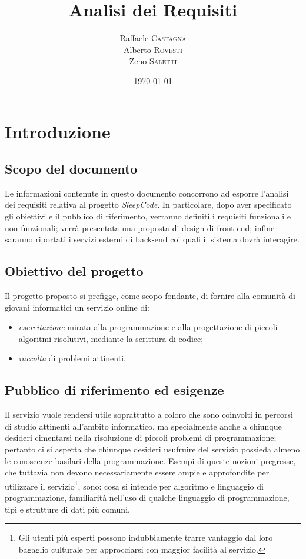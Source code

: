 \documentclass[11pt, a4paper]{article}
\title{Analisi dei Requisiti}
\author{Raffaele \textsc{Castagna}\\
Alberto \textsc{Rovesti}\\
Zeno \textsc{Saletti}}
\date{\today}
\theoremstyle{definition}
\begin{document}


\tableofcontents


\newpage
\section{Introduzione}
\subsection{Scopo del documento}
Le informazioni contenute in questo documento concorrono ad esporre l'analisi
dei requisiti relativa al progetto \textit{SleepCode}. In particolare, dopo
aver specificato gli obiettivi e il pubblico di riferimento, verranno definiti i requisiti
funzionali e non funzionali; verrà presentata una proposta di design di
front-end; infine saranno riportati i servizi esterni di back-end coi quali il
sistema dovrà interagire.


\subsection{Obiettivo del progetto}
Il progetto proposto si prefigge, come scopo fondante, di fornire alla comunità
di giovani informatici un servizio online di:
\begin{itemize}
    \item \textit{esercitazione} mirata alla programmazione e alla progettazione
    di piccoli algoritmi risolutivi, mediante la scrittura di codice;
    \item \textit{raccolta} di problemi attinenti.
\end{itemize}

\subsection{Pubblico di riferimento ed esigenze}
Il servizio vuole rendersi utile soprattutto a coloro che sono coinvolti
in percorsi di studio attinenti all'ambito informatico, ma specialmente anche
a chiunque desideri cimentarsi nella risoluzione di piccoli problemi di
programmazione; pertanto ci si aspetta che chiunque desideri usufruire del
servizio possieda almeno le conoscenze basilari della programmazione. Esempi
di queste nozioni pregresse, che tuttavia non devono necessariamente essere ampie e approfondite per utilizzare il servizio\footnote{Gli utenti più esperti possono indubbiamente trarre vantaggio dal loro bagaglio culturale per
approcciarsi con maggior facilità al servizio.}, sono: cosa si intende per
algoritmo e linguaggio di programmazione, familiarità nell'uso di qualche
linguaggio di programmazione, tipi e strutture di dati più comuni.
\end{document}
